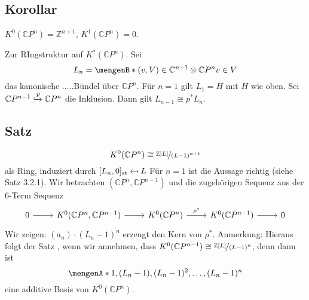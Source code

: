 \subsection*{Korollar} %
\label{sub:korollar}
$K^0(\mathds{C}P^n) = \mathds{Z}^{n+1}$, $K^1(\mathds{C}P^n)=0$.

\bigskip

Zur RIngstruktur auf $K^*(\mathds{C}P^n)$. Sei
\[
	L_n = \set[(v,V) \in \mathds{C}^{n+1} \otimes \mathds{C}P^n]{v \in V} 
\]
das kanonische .....Bündel über $\mathds{C}P^n$. Für $n=1$ gilt $L_1=H$ mit $H$ wie oben. Sei $\mathds{C}P^{n-1} \xhookrightarrow{p}\mathds{C}P^n$ die Inklusion. Dann gilt
$L_{n-1} \cong p^* L_n$.

\subsection*{Satz} %
\label{sub:satz}
\[
	K^0(\mathds{C}P^n) \cong \nicefrac{\mathds{Z}[L]}{(L-1)^{n+1}}
\]
als Ring, induziert durch $[L_n,0]_\st \mapsfrom L$
Für $n=1$ ist die Aussage richtig (siehe Satz 3.2.1). Wir betrachten $(\mathds{C}P^n, \mathds{C}P^{n-1})$ und die zugehörigen Sequenz aus der 6-Term Sequenz
\[
	\begin{tikzcd}
		0 \rar & K^0(\mathds{C}P^n, \mathds{C}P^{n-1}) \rar & K^0(\mathds{C}P^n) \rar["\rho^*"] & K^0(\mathds{C}P^{n-1}) \rar & 0
	\end{tikzcd}
\]
Wir zeigen: $(a_n)\cdot (L_n-1)^n$ erzeugt den Kern von $\rho^*$. Anmerkung: Hieraus folgt der Satz , wenn wir annehmen, dass 
$K^0(\mathds{C}P^{n-1}) \cong \nicefrac{\mathds{Z}[L]}{(L-1)^n}$, denn dann ist
\[
	\set{1, (L_n-1), (L_n-1)^2, \ldots , (L_n-1)^n} 
\]
eine additive Basis von $K^0(\mathds{C}P^n)$.

